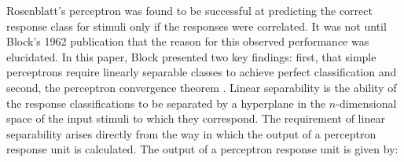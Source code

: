 \documentclass[11pt]{afthesis}
\begin{document}
	
	Rosenblatt's perceptron was found to be successful at predicting the correct response class for stimuli only if the responses were correlated. It was not until Block's 1962 publication that the reason for this observed performance was elucidated. In this paper, Block presented two key findings: first, that simple perceptrons require linearly separable classes to achieve perfect classification and second, the perceptron convergence theorem \cite{block1962perceptron}. Linear separability is the ability of the response classifications to be separated by a hyperplane in the \begin{math}n\end{math}-dimensional space of the input stimuli to which they correspond. The requirement of linear separability arises directly from the way in which the output of a perceptron response unit is calculated. The output of a perceptron response unit is given by:
\end{document}
